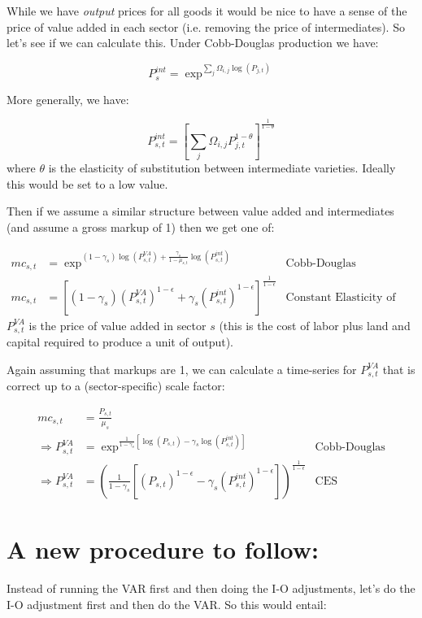 \documentclass[12pt,english]{article}
\begin{document}
While we have \emph{output} prices for all goods it would be nice to  have a sense of the price of value added in each sector (i.e. removing the price of intermediates). So let's see if we can calculate this. Under Cobb-Douglas production we have:

\[
	P_s^{int} = \exp^{\sum_{j}\Omega_{i,j}\log(P_{j,t})}
\]

More generally, we have:

\[
	P_{s,t}^{int} = \left[\sum_{j}\Omega_{i,j}P_{j,t}^{1-\theta}\right]^{\frac{1}{1-\theta}}
\]
where $\theta$ is the elasticity of substitution between intermediate varieties. Ideally this would be set to a low value.

Then if we assume a similar structure between value added and intermediates (and assume a gross markup of 1) then we get one of:

\begin{align*}
	mc_{s,t}&=\exp^{(1-\gamma_s)\log(P_{s,t}^{VA})+\frac{\gamma_s}{1-\mu_{s,t}}\log(P_{s,t}^{int})} & \text{Cobb-Douglas Production}\\
mc_{s,t}&=\left[(1-\gamma_s)(P_{s,t}^{VA})^{1-\epsilon}+\gamma_s(P_{s,t}^{int})^{1-\epsilon}\right]^{\frac{1}{1-\epsilon}} & \text{Constant Elasticity of Substitution Production}	
\end{align*}
$P_{s,t}^{VA}$ is the price of value added in sector $s$ (this is the cost of labor plus land and capital required to produce a unit of output). 

Again assuming that markups are 1, we can calculate a time-series for $P_{s,t}^{VA}$ that is correct up to a (sector-specific) scale factor:

\begin{align*}
	mc_{s,t}&=\frac{P_{s,t}}{\mu_s}\\
	\Rightarrow P_{s,t}^{VA} &= \exp^{\frac{1}{1-\gamma_s}\left[\log(P_{s,t})-\gamma_s\log(P_{s,t}^{int})\right]}&\text{Cobb-Douglas}\\
	\Rightarrow P_{s,t}^{VA} &= \left(\frac{1}{1-\gamma_s}\left[\left(P_{s,t}\right)^{1-\epsilon}-\gamma_s(P_{s,t}^{int})^{1-\epsilon}\right]\right)^{\frac{1}{1-\epsilon}}&\text{CES}
\end{align*}

\section{A new procedure to follow:}

Instead of running the VAR first and then doing the I-O adjustments, let's do the I-O adjustment first and then do the VAR. So this would entail:
\end{document}
